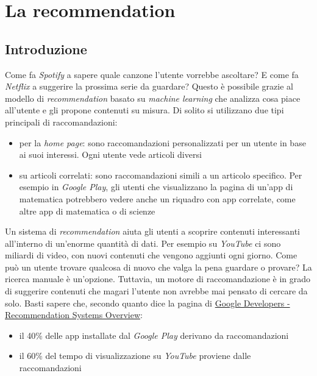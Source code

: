 \chapter{La recommendation}

\section{Introduzione}

Come fa \textit{Spotify} a sapere quale canzone l'utente vorrebbe ascoltare? E come fa \textit{Netflix} a suggerire la prossima serie da guardare? Questo è possibile grazie al modello di \textit{recommendation} basato su \textit{machine learning} che analizza cosa piace all'utente e gli propone contenuti su misura. Di solito si utilizzano due tipi principali di raccomandazioni:

\begin{itemize}
    \item per la \textit{home page}: sono raccomandazioni personalizzati per un utente in base ai suoi interessi. Ogni utente vede articoli diversi
    \item su articoli correlati: sono raccomandazioni simili a un articolo specifico. Per esempio in \textit{Google Play}, gli utenti che visualizzano la pagina di un'app di matematica potrebbero vedere anche un riquadro con app correlate, come altre app di matematica o di scienze
\end{itemize}

Un sistema di \textit{recommendation} aiuta gli utenti a scoprire contenuti interessanti all'interno di un'enorme quantità di dati. Per esempio su \textit{YouTube} ci sono miliardi di video, con nuovi contenuti che vengono aggiunti ogni giorno. Come può un utente trovare qualcosa di nuovo che valga la pena guardare o provare? La ricerca manuale è un'opzione. Tuttavia, un motore di raccomandazione è in grado di suggerire contenuti che magari l'utente non avrebbe mai pensato di cercare da solo. Basti sapere che, secondo quanto dice la pagina di \href{https://developers.google.com/machine-learning/recommendation/overview}{Google Developers - Recommendation Systems Overview}:

\begin{itemize}
    \item il 40\% delle app installate dal \textit{Google Play} derivano da raccomandazioni
    \item il 60\% del tempo di visualizzazione su \textit{YouTube} proviene dalle raccomandazioni
\end{itemize}


